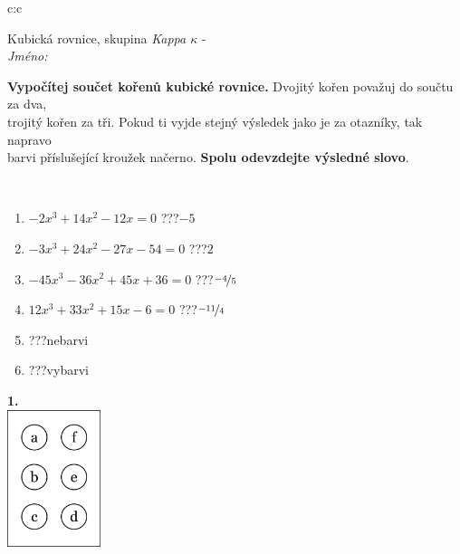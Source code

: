 \documentclass[10pt]{report}
\begin{document}
\begin{tabular}{c:c}
\begin{minipage}[c][104.5mm][t]{0.5\linewidth}
\begin{center}
\vspace{7mm}
{\huge Kubická rovnice, skupina \textit{Kappa $\kappa$} -}\\[5mm]
\textit{Jméno:}\phantom{xxxxxxxxxxxxxxxxxxxxxxxxxxxxxxxxxxxxxxxxxxxxxxxxxxxxxxxxxxxxxxxxx}\\[5mm]
\begin{minipage}{0.95\linewidth}
\begin{center}
\textbf{Vypočítej součet kořenů kubické rovnice.} Dvojitý kořen považuj do součtu za dva,\\trojitý kořen za tři. Pokud ti vyjde stejný výsledek jako je za otazníky, tak napravo\\barvi příslušející kroužek načerno. \textbf{Spolu odevzdejte výsledné slovo}.
\end{center}
\end{minipage}
\\[1mm]
\begin{minipage}{0.79\linewidth}
\begin{center}
\begin{varwidth}{\linewidth}
\begin{enumerate}
\Large
\item $-2x^3+14x^2-12x=0$\quad \dotfill\; ???\;\dotfill \quad $-5$
\item $-3x^3+24x^2-27x-54=0$\quad \dotfill\; ???\;\dotfill \quad $2$
\item $-45x^3-36x^2+45x+36=0$\quad \dotfill\; ???\;\dotfill \quad $\nicefrac{-4}{5}$
\item $12x^3+33x^2+15x-6=0$\quad \dotfill\; ???\;\dotfill \quad $\nicefrac{-11}{4}$
\item \quad \dotfill\; ???\;\dotfill \quad nebarvi
\item \quad \dotfill\; ???\;\dotfill \quad vybarvi
\end{enumerate}
\end{varwidth}
\end{center}
\end{minipage}
\begin{minipage}{0.20\linewidth}
\begin{center}
{\Huge\bfseries 1.} \\[2mm]
\includegraphics[height=40mm]{../images/braille.png}

\end{center}
\end{minipage}
\end{center}
\end{minipage}
\end{tabular}
\end{document}
